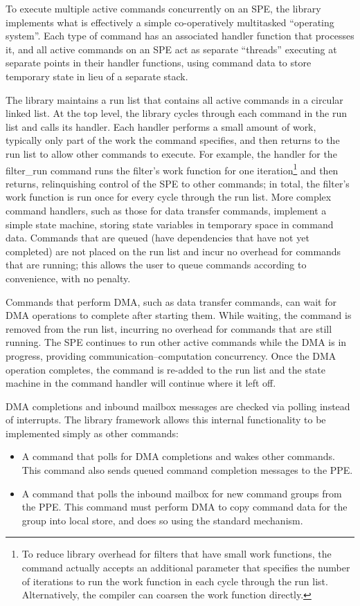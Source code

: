 To execute multiple active commands concurrently on an SPE, the library implements what is effectively a simple co-operatively multitasked ``operating system''. Each type of command has an associated handler function that processes it, and all active commands on an SPE act as separate ``threads'' executing at separate points in their handler functions, using command data to store temporary state in lieu of a separate stack.

The library maintains a run list that contains all active commands in a circular linked list. At the top level, the library cycles through each command in the run list and calls its handler. Each handler performs a small amount of work, typically only part of the work the command specifies, and then returns to the run list to allow other commands to execute. For example, the handler for the \textsf{filter\_run} command runs the filter's work function for one iteration\footnote{To reduce library overhead for filters that have small work functions, the command actually accepts an additional parameter that specifies the number of iterations to run the work function in each cycle through the run list. Alternatively, the compiler can coarsen the work function directly.} and then returns, relinquishing control of the SPE to other commands; in total, the filter's work function is run once for every cycle through the run list. More complex command handlers, such as those for data transfer commands, implement a simple state machine, storing state variables in temporary space in command data. Commands that are queued (have dependencies that have not yet completed) are not placed on the run list and incur no overhead for commands that are running; this allows the user to queue commands according to convenience, with no penalty.

Commands that perform DMA, such as data transfer commands, can wait for DMA operations to complete after starting them. While waiting, the command is removed from the run list, incurring no overhead for commands that are still running. The SPE continues to run other active commands while the DMA is in progress, providing communication--computation concurrency. Once the DMA operation completes, the command is re-added to the run list and the state machine in the command handler will continue where it left off.

DMA completions and inbound mailbox messages are checked via polling instead of interrupts. The library framework allows this internal functionality to be implemented simply as other commands:
\begin{itemize}
\item A command that polls for DMA completions and wakes other commands. This command also sends queued command completion messages to the PPE.
\item A command that polls the inbound mailbox for new command groups from the PPE. This command must perform DMA to copy command data for the group into local store, and does so using the standard mechanism.
\end{itemize}

